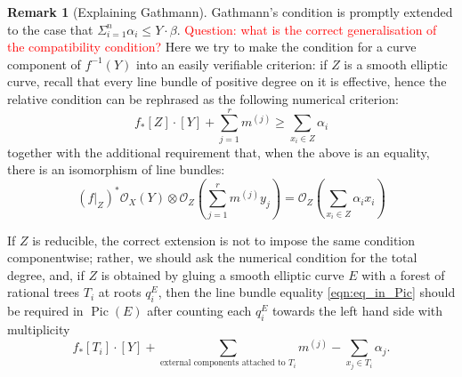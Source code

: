 \documentclass[11pt]{amsart}
\newcommand{\OO}{\mathcal{O}}
\newcommand{\Pic}{\operatorname{Pic}}
\theoremstyle{definition}
\theoremstyle{definition}
\newtheorem{remark}[thm]{Remark}
\begin{document}
\begin{remark}[Explaining Gathmann]
Gathmann's condition is promptly extended to the case that $\Sigma_{i=1}^n \alpha_i \leq Y \cdot \beta$. \textcolor{red}{Question: what is the correct generalisation of the compatibility condition?} Here we try to make the condition for a curve component of $f^{-1}(Y)$ into an easily verifiable criterion: if $Z$ is a smooth elliptic curve, recall that every line bundle of positive degree on it is effective, hence the relative condition can be rephrased as the following numerical criterion:
\begin{equation*} f_*[Z]\cdot [Y]+\sum_{j=1}^r m^{(j)}\geq \sum_{x_i\in Z}\alpha_i \end{equation*}
together with the additional requirement that, when the above is an equality, there is an isomorphism of line bundles:
\begin{equation}\label{eqn:eq_in_Pic}
(f|_{Z})^*\OO_X(Y) \otimes \OO_Z\left(\sum_{j=1}^r m^{(j)}y_j\right)=\OO_Z\left(\sum_{x_i\in Z}\alpha_ix_i\right) 
\end{equation}
 
 If $Z$ is reducible, the correct extension is not to impose the same condition componentwise; rather, we should ask the numerical condition for the total degree, and, if $Z$ is obtained by gluing a smooth elliptic curve $E$ with a forest of rational trees $T_i$ at roots $q^E_i$, then the line bundle equality \eqref{eqn:eq_in_Pic} should be required in $\Pic(E)$ after counting each $q^E_i$ towards the left hand side with multiplicity
 \[f_*[T_i]\cdot [Y]+\sum_{\text{external components attached to $T_i$}} m^{(j)}- \sum_{x_j\in T_i}\alpha_j.\]
 
\end{remark}
\end{document}
